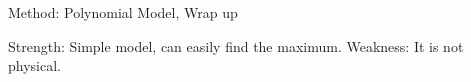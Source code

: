 \documentclass[10pt]{beamer}
\begin{document}
\begin{frame}{Method: Polynomial Model, Wrap up}
	\begin{outline}
		\0Strength:
		\1Simple model, can easily find the maximum.
		\0Weakness:
		\1It is not physical.
	\end{outline}
\end{frame}



\end{document}
